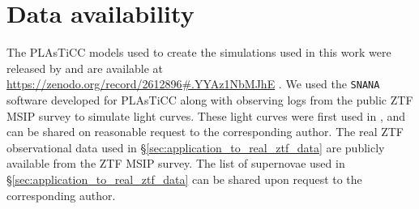 \documentclass[fleqn,usenatbib]{mnras}
\begin{document}
\section*{Data availability}
The PLAsTiCC models used to create the simulations used in this work were released by \citet{KesslerPlasticcModels} and are available at \url{https://zenodo.org/record/2612896#.YYAz1NbMJhE} \citep{plasticc_modelers_2019_2612896}. We used the \texttt{SNANA} \citep{Kessler2010SNANA:Analysis} software developed for PLAsTiCC along with observing logs from the public ZTF MSIP survey to simulate light curves. These light curves were first used in \citet{Muthukrishna19RAPID}, and can be shared on reasonable request to the corresponding author. The real ZTF observational data used in \S\ref{sec:application_to_real_ztf_data} are publicly available from the ZTF MSIP survey. The list of supernovae used in \S\ref{sec:application_to_real_ztf_data} can be shared upon request to the corresponding author.












\appendix

\end{document}
